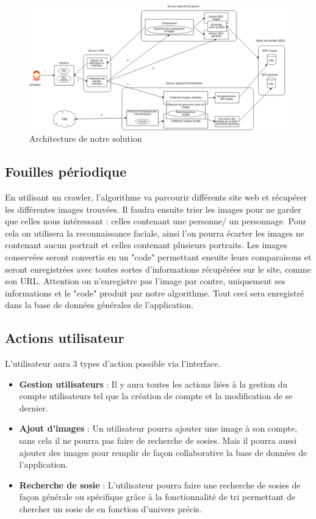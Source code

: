 \documentclass[a4paper,12pt]{article}
\begin{document}
\begin{figure}[!ht]
    \centering
        \includegraphics[scale=0.4, angle=-90]{images/Architecture_VILLER.png}
        \caption{Architecture de notre solution}
    \end{figure}

    
 \subsection{Fouilles périodique} 
 En utilisant un crawler, l'algorithme va parcourir différents site web et récupérer les différentes images trouvées. Il faudra ensuite trier les images pour ne garder que celles nous intéressant : celles contenant une personne/ un personnage. Pour cela on utilisera la reconnaissance faciale, ainsi l'on pourra écarter les images ne contenant aucun portrait et celles contenant plusieurs portraits. Les images conservées seront convertis en un "code" permettant ensuite leurs comparaisons et seront enregistrées avec toutes sortes d'informations récupérées sur le site, comme son URL. Attention on n'enregistre pas l'image par contre, uniquement ses informations et le "code" produit par notre algorithme. Tout ceci sera enregistré dans la base de données générales de l'application. 
 \subsection{Actions utilisateur}
 L'utilisateur aura 3 types d'action possible via l'interface. 
 \begin{itemize}
     \item \textbf{Gestion utilisateurs} : Il y aura toutes les actions liées à la gestion du compte utilisateurs tel que la création de compte et la modification de se dernier. 
     \item \textbf{Ajout d'images} : Un utilisateur pourra ajouter une image à son compte, sans cela il ne pourra pas faire de recherche de sosies. Mais il pourra aussi ajouter des images pour remplir de façon collaborative la base de données de l'application. 
     \item \textbf{Recherche de sosie} : L'utilisateur pourra faire une recherche de sosies de façon générale ou spécifique grâce à la fonctionnalité de tri permettant de chercher un sosie de en fonction d'univers précis. 
 \end{itemize}
\end{document}
